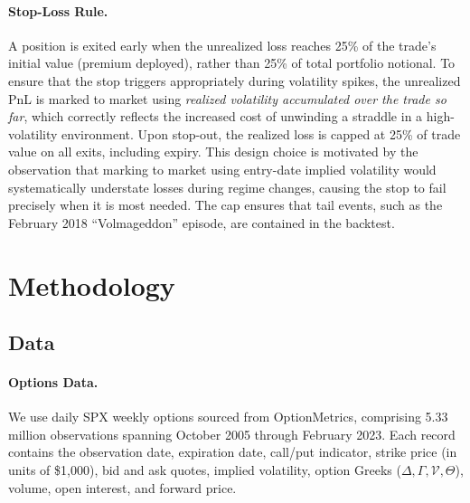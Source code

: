 \documentclass[11pt,a4paper]{article}
\begin{document}
\paragraph{Stop-Loss Rule.}
A position is exited early when the unrealized loss reaches 25\% of the trade's initial value (premium deployed), rather than 25\% of total portfolio notional.
To ensure that the stop triggers appropriately during volatility spikes, the unrealized PnL is marked to market using \emph{realized volatility accumulated over the trade so far}, which correctly reflects the increased cost of unwinding a straddle in a high-volatility environment.
Upon stop-out, the realized loss is capped at 25\% of trade value on all exits, including expiry.
This design choice is motivated by the observation that marking to market using entry-date implied volatility would systematically understate losses during regime changes, causing the stop to fail precisely when it is most needed.
The cap ensures that tail events, such as the February 2018 ``Volmageddon'' episode, are contained in the backtest.


\section{Methodology}

\subsection{Data}

\paragraph{Options Data.}
We use daily SPX weekly options sourced from OptionMetrics, comprising 5.33 million observations spanning October 2005 through February 2023.
Each record contains the observation date, expiration date, call/put indicator, strike price (in units of \$1{,}000), bid and ask quotes, implied volatility, option Greeks ($\Delta, \Gamma, \mathcal{V}, \Theta$), volume, open interest, and forward price.
\end{document}
